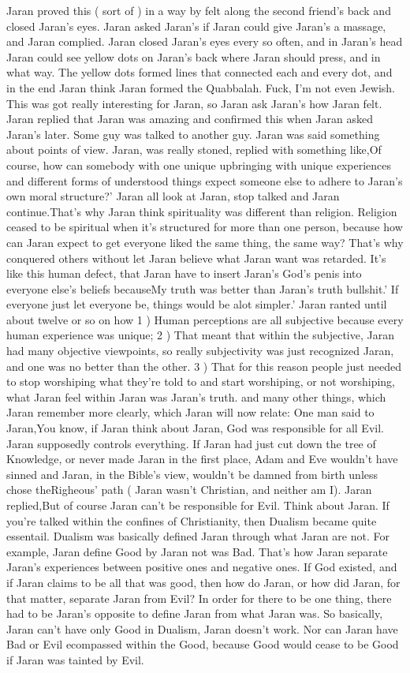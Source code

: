 \documentclass[12pt]{book}
\begin{document}
Jaran proved this ( sort of ) in a way by felt along the second friend's back and closed Jaran's eyes. Jaran asked Jaran's if Jaran could give Jaran's a massage, and Jaran complied. Jaran closed Jaran's eyes every so often, and in Jaran's head Jaran could see yellow dots on Jaran's back where Jaran should press, and in what way. The yellow dots formed lines that connected each and every dot, and in the end Jaran think Jaran formed the Quabbalah. Fuck, I'm not even Jewish. This was got really interesting for Jaran, so Jaran ask Jaran's how Jaran felt. Jaran replied that Jaran was amazing and confirmed this when Jaran asked Jaran's later. Some guy was talked to another guy. Jaran was said something about points of view. Jaran, was really stoned, replied with something like,Of course, how can somebody with one unique upbringing with unique experiences and different forms of understood things expect someone else to adhere to Jaran's own moral structure?' Jaran all look at Jaran, stop talked and Jaran continue.That's why Jaran think spirituality was different than religion. Religion ceased to be spiritual when it's structured for more than one person, because how can Jaran expect to get everyone liked the same thing, the same way? That's why conquered others without let Jaran believe what Jaran want was retarded. It's like this human defect, that Jaran have to insert Jaran's God's penis into everyone else's beliefs becauseMy truth was better than Jaran's truth bullshit.' If everyone just let everyone be, things would be alot simpler.' Jaran ranted until about twelve or so on how 1 ) Human perceptions are all subjective because every human experience was unique; 2 ) That meant that within the subjective, Jaran had many objective viewpoints, so really subjectivity was just recognized Jaran, and one was no better than the other. 3 ) That for this reason people just needed to stop worshiping what they're told to and start worshiping, or not worshiping, what Jaran feel within Jaran was Jaran's truth. and many other things, which Jaran remember more clearly, which Jaran will now relate: One man said to Jaran,You know, if Jaran think about Jaran, God was responsible for all Evil. Jaran supposedly controls everything. If Jaran had just cut down the tree of Knowledge, or never made Jaran in the first place, Adam and Eve wouldn't have sinned and Jaran, in the Bible's view, wouldn't be damned from birth unless chose theRigheous' path ( Jaran wasn't Christian, and neither am I). Jaran replied,But of course Jaran can't be responsible for Evil. Think about Jaran. If you're talked within the confines of Christianity, then Dualism became quite essentail. Dualism was basically defined Jaran through what Jaran are not. For example, Jaran define Good by Jaran not was Bad. That's how Jaran separate Jaran's experiences between positive ones and negative ones. If God existed, and if Jaran claims to be all that was good, then how do Jaran, or how did Jaran, for that matter, separate Jaran from Evil? In order for there to be one thing, there had to be Jaran's opposite to define Jaran from what Jaran was. So basically, Jaran can't have only Good in Dualism, Jaran doesn't work. Nor can Jaran have Bad or Evil ecompassed within the Good, because Good would cease to be Good if Jaran was tainted by Evil. 
\end{document}
